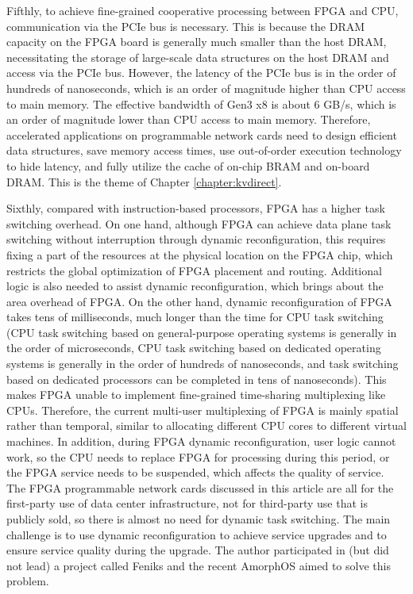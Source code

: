 Fifthly, to achieve fine-grained cooperative processing between FPGA and CPU, communication via the PCIe bus is necessary. This is because the DRAM capacity on the FPGA board is generally much smaller than the host DRAM, necessitating the storage of large-scale data structures on the host DRAM and access via the PCIe bus. However, the latency of the PCIe bus is in the order of hundreds of nanoseconds, which is an order of magnitude higher than CPU access to main memory. The effective bandwidth of Gen3 x8 is about 6 GB/s, which is an order of magnitude lower than CPU access to main memory. Therefore, accelerated applications on programmable network cards need to design efficient data structures, save memory access times, use out-of-order execution technology to hide latency, and fully utilize the cache of on-chip BRAM and on-board DRAM. This is the theme of Chapter \ref{chapter:kvdirect}.

Sixthly, compared with instruction-based processors, FPGA has a higher task switching overhead. On one hand, although FPGA can achieve data plane task switching without interruption through dynamic reconfiguration, this requires fixing a part of the resources at the physical location on the FPGA chip, which restricts the global optimization of FPGA placement and routing. Additional logic is also needed to assist dynamic reconfiguration, which brings about the area overhead of FPGA.
On the other hand, dynamic reconfiguration of FPGA takes tens of milliseconds, much longer than the time for CPU task switching (CPU task switching based on general-purpose operating systems is generally in the order of microseconds, CPU task switching based on dedicated operating systems is generally in the order of hundreds of nanoseconds, and task switching based on dedicated processors can be completed in tens of nanoseconds). This makes FPGA unable to implement fine-grained time-sharing multiplexing like CPUs. Therefore, the current multi-user multiplexing of FPGA is mainly spatial rather than temporal, similar to allocating different CPU cores to different virtual machines. In addition, during FPGA dynamic reconfiguration, user logic cannot work, so the CPU needs to replace FPGA for processing during this period, or the FPGA service needs to be suspended, which affects the quality of service.
The FPGA programmable network cards discussed in this article are all for the first-party use of data center infrastructure, not for third-party use that is publicly sold, so there is almost no need for dynamic task switching. The main challenge is to use dynamic reconfiguration to achieve service upgrades and to ensure service quality during the upgrade. The author participated in (but did not lead) a project called Feniks \cite{zhang2017feniks} and the recent AmorphOS \cite{khawaja2018sharing} aimed to solve this problem.

